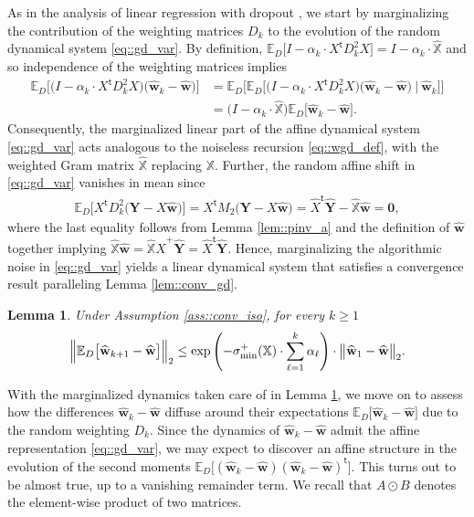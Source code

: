 \documentclass{article}
\newcommand*{\E}{\mathbb{E}} %
\newcommand*{\bbX}{\mathbb{X}}
\newcommand*{\bfY}{\mathbf{Y}}
\newcommand*{\bfw}{\mathbf{w}}
\newcommand*{\pinv}{^{+}}
\newcommand*{\tran}{^{\mathsf{t}}}
\newcommand*{\sigminp}{\sigma_{\mathrm{min}}^+}
\newcommand*{\bigmid}{\ \big\vert\ }
\DeclarePairedDelimiter{\norm}{\lVert}{\rVert}
\newcommand{\whweight}{\widehat{\bfw}}
\newcommand{\whX}{\widehat{X}}
\newcommand{\whbbX}{\widehat{\bbX}}
\newcommand{\whY}{\widehat{\bfY}}
\newtheorem{lemma}{Lemma}[section]
\begin{document}
As in the analysis of linear regression with dropout
\cite{clara_langer_et_al_2024}, we start by marginalizing the contribution of
the weighting matrices $D_k$ to the evolution of the random dynamical system
\eqref{eq::gd_var}. By definition, $\E_D\big[I - \alpha_k \cdot X\tran D_k^2
X\big] = I - \alpha_k \cdot \whbbX$ and so independence of the weighting
matrices implies \begin{equation}
  \label{eq::exp_lin}
  \begin{split}
    \E_D\Big[\big(I - \alpha_k \cdot X\tran D_k^2 X\big) \big(\whweight_k -
    \whweight\big)\Big] &= \E_D\Bigg[\E_D\Big[\big(I - \alpha_k \cdot X\tran
    D_k^2 X\big) \big(\whweight_k - \whweight\big) \bigmid
    \whweight_k\Big]\Bigg]\\
    &= \big(I - \alpha_k \cdot \whbbX\big) \E_D\big[\whweight_k -
    \whweight\big].
  \end{split}
\end{equation} Consequently, the marginalized linear part of the affine
dynamical system \eqref{eq::gd_var} acts analogous to the noiseless recursion
\eqref{eq::wgd_def}, with the weighted Gram matrix $\whbbX$ replacing $\bbX$.
Further, the random affine shift in \eqref{eq::gd_var} vanishes in mean since
\begin{align}
  \label{eq::exp_shift}
  \E_D\Big[X\tran D_k^2 \big(\bfY - X \whweight\big)\Big] = X\tran M_2 \big(\bfY
  - X \whweight\big) = \whX\tran \whY - \whbbX \whweight = \mathbf{0},
\end{align} where the last equality follows from Lemma \ref{lem::pinv_a} and
the definition of $\whweight$ together implying $\whbbX \whweight = \whbbX
\whX\pinv \whY = \whX\tran \whY$. Hence, marginalizing the algorithmic noise in
\eqref{eq::gd_var} yields a linear dynamical system that satisfies a
convergence result paralleling Lemma \ref{lem::conv_gd}.

\begin{lemma}
  \label{lem::conv_exp_iso}
  Under Assumption \ref{ass::conv_iso}, for every $k \geq 1$
  \begin{align*}
    \norm[\Big]{\E_D\big[\whweight_{k + 1} - \whweight\big]}_2 \leq \exp \left(-
    \sigminp(\bbX) \cdot \sum_{\ell = 1}^k \alpha_\ell\right) \cdot
    \norm[\big]{\whweight_1 - \whweight}_2.
  \end{align*}
\end{lemma}

With the marginalized dynamics taken care of in Lemma \ref{lem::conv_exp_iso},
we move on to assess how the differences $\whweight_k - \whweight$ diffuse
around their expectations $\E_D\big[\whweight_k - \whweight\big]$ due to the
random weighting $D_k$. Since the dynamics of $\whweight_k - \whweight$ admit
the affine representation \eqref{eq::gd_var}, we may expect to discover an
affine structure in the evolution of the second moments $\E_D\big[(\whweight_k -
\whweight) (\whweight_k - \whweight)\tran\big]$. This turns out to be almost
true, up to a vanishing remainder term. We recall that $A \odot B$ denotes the
element-wise product of two matrices.
\end{document}
